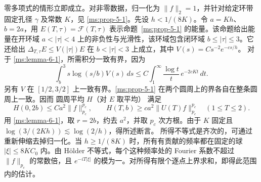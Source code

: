 零多项式的情形立即成立。对非零数据，归一化为 \(\|f\|_2=1\)，并针对给定环带固定孔径 \(\gamma\) 及常数 \(K\)，见 \ref{ms:prop-5-1}。先设 \(h<1/(8K)\)。令 \(a=Kh\)、\(b=2a\)，用 \(E(T,\tau)=\mathcal F(T,\tau)\) 表示命题~\ref{ms:prop-5-1} 的能量。该命题给出能量在开环域 \(a<|\tau|<4\) 上的非负性与光滑性，该环域包含闭环域 \(b\le|\tau|\le3\)。它还给出 \(\Delta_{T,\tau}E\le V(|\tau|)E\) 在 \(b<|\tau|<3\) 上成立，其中
\(V(s)=Cs^{-2}e^{-cs/h}\)。
对于 \ref{ms:lemma-6-1}，所需积分一致有界，因为
\[
 \int_b^3s\log(s/b)V(s)\,ds
 \le C\int_1^\infty \frac{\log t}{t}\,e^{-2cKt}\,dt .
\]
另有 \(V\) 在 \([1/2,3/2]\) 上一致有界。\ref{ms:prop-5-1} 在两个圆周上的界各自在整条圆周上一致。因而 圆周平均 \(H\)（对 \(E\) 取平均） 满足
\[
 H(0,2b)\le Ca^2\|f\|_{p_c}^{p_c},\qquad
 H(T,b)\ge ca^2\|U(T)f\|_{p_c}^{p_c}\quad(1\le T\le2).
\]
用 \ref{ms:lemma-6-1}，取 \(r=2b\)，约去 \(a^2\)，并取 \(p_c\) 次方根。由于 \(K\) 固定且 \(\log(3/(2Kh))\lesssim\log(2/h)\)，得所述断言。
所得不等式是齐次的，可通过重新伸缩去掉归一化。当 \(h\ge1/(8K)\) 时，所有有贡献的频率都在固定的球 \(|\xi|\le8KC_0\) 内。由 Hölder 不等式，每个这种频率处的 Fourier 系数不超过 \(\|f\|_{p_c}\) 的常数倍，且 \(e^{-iT|\xi|}\) 的模为一。对所得有限个逐点上界求和，即得此范围内的估计。
